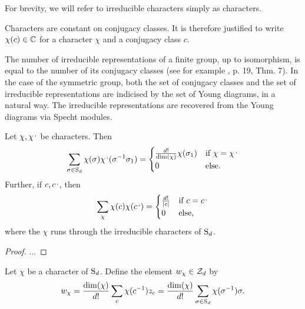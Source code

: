 For brevity, we will refer to irreducible characters simply as characters. 

\begin{rmk}
 Characters are constant on conjugacy classes. It is therefore justified to write $\chi(c)\in\mathbb{C}$ for a character $\chi$ and a conjugacy class $c$.
\end{rmk}

\begin{rmk}
 The number of irreducible representations of a finite group, up to isomorphism, is equal to the number of its conjugacy classes (see for example \cite{Serre77}, p. 19, Thm. 7). In the case of the symmetric group, both the set of conjugacy classes and the set of irreducible representations are indicised by the set of Young diagrams, in a natural way. The irreducible representations are recovered from the Young diagrams via Specht modules.
\end{rmk}

\begin{prop}
 Let $\chi, \chi^\textrm{\,,}$ be characters. Then
 \[
  \sum_{\sigma\in\operatorname{S}_d}\chi(\sigma)\chi^\textrm{\,,}(\sigma^{-1}\sigma_1) = 
   \begin{cases} \frac{d!}{\dim(\chi)}\chi(\sigma_1) &\mbox{if } \chi = \chi^\textrm{\,,} \\
                                     0 &\mbox{else.}
   \end{cases} 
 \]
 Further, if $c, c^\textrm{\,,}$, then
 \[
  \sum_{\chi}\chi(c)\chi(c^\textrm{\,,}) =
   \begin{cases} \frac{d!}{|c|} &\mbox{if } c = c^\textrm{\,,} \\
                                  0 &\mbox{else,}
   \end{cases}
 \]
 where the $\chi$ runs through the irreducible characters of $\operatorname{S}_d$.
\end{prop}
\begin{proof}
 ...
\end{proof}

\begin{defi}
 Let $\chi$ be a character of $\operatorname{S}_d$. Define the element $w_\chi \in \mathcal{Z}_d$ by
 \[
  w_\chi = \frac{\dim(\chi)}{d!}\sum_{c}\chi(c^{-1})z_c = \frac{\dim(\chi)}{d!}\sum_{\sigma\in\operatorname{S}_d}\chi(\sigma^{-1})\sigma.
 \]
\end{defi}

